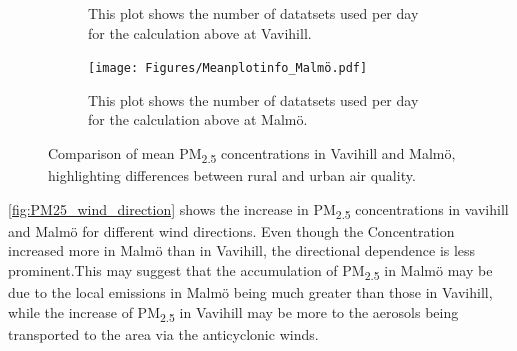\begin{figure}[H]
\begin{subfigure}[b]{0.49\textwidth}
        \caption{This plot shows the number of datatsets used per day for the calculation above at Vavihill.}
        \label{fig:Meanplotinfo_Vavihill}
    \end{subfigure}
    \hfill
    \begin{subfigure}[b]{0.49\textwidth}
        \centering
        \texttt{[image: Figures/Meanplotinfo\_Malmö.pdf]}
        \caption{This plot shows the number of datatsets used per day for the calculation above at Malmö.}
        \label{fig:Meanplotinfo_Malmö}
    \end{subfigure}
    \caption{Comparison of mean PM\textsubscript{2.5} concentrations in Vavihill and Malmö, highlighting differences between rural and urban air quality.}
    \label{fig:Meanplot_Comparison}
\end{figure}


\autoref{fig:PM25_wind_direction} shows the increase in PM\textsubscript{2.5} concentrations in vavihill and Malmö for different wind directions. Even though the Concentration increased more in Malmö than in Vavihill, the directional dependence is less prominent.This may suggest that the accumulation of PM\textsubscript{2.5} in Malmö may be due to the local emissions in Malmö being much greater than those in Vavihill, while the increase of PM\textsubscript{2.5} in Vavihill may be more to the aerosols being transported to the area via the anticyclonic winds.  



